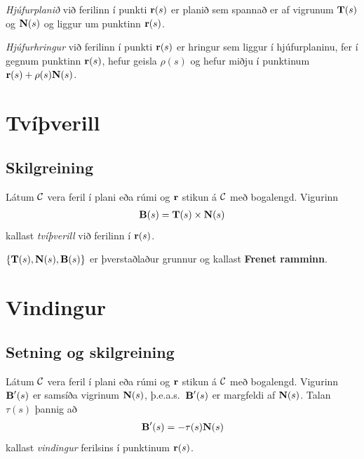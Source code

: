 \documentclass[a4paper,10pt,icelandic]{sphinxmanual}
\begin{document}
\textit{Hjúfurplanið} við ferilinn í punkti
\(\mbox{${\bf r}$}(s)\) er planið sem spannað er af vigrunum
\(\mbox{${\bf T}$}(s)\) og \(\mbox{${\bf N}$}(s)\) og liggur um
punktinn \(\mbox{${\bf r}$}(s)\).

\textit{Hjúfurhringur} við ferilinn í punkti
\(\mbox{${\bf r}$}(s)\) er hringur sem liggur í hjúfurplaninu, fer í
gegnum punktinn \(\mbox{${\bf r}$}(s)\), hefur geisla
\(\rho(s)\) og hefur miðju í punktinum
\(\mbox{${\bf r}$}(s)+\rho(s)\mbox{${\bf N}$}(s)\).


\section{Tvíþverill}
\label{Kafli1:tviverill}

\subsection{Skilgreining}
\label{Kafli1:id18}\label{Kafli1:index-18}
Látum \(\cal C\) vera feril í plani eða rúmi og
\(\mbox{${\bf r}$}\) stikun á \(\cal C\) með bogalengd. Vigurinn
\begin{gather}
\begin{split}\displaystyle \mbox{${\bf B}$}(s)=\mbox{${\bf T}$}(s)\times \mbox{${\bf N}$}(s)\end{split}\notag
\end{gather}
kallast \textit{tvíþverill} við ferilinn í
\(\mbox{${\bf r}$}(s)\).

\(\{\mbox{${\bf T}$}(s),\mbox{${\bf N}$}(s),\mbox{${\bf B}$}(s)\}\)
er þverstaðlaður grunnur og kallast \textbf{Frenet ramminn}.


\section{Vindingur}
\label{Kafli1:vindingur}

\subsection{Setning og skilgreining}
\label{Kafli1:index-19}\label{Kafli1:setning-og-skilgreining}
Látum \(\cal C\) vera feril í plani eða rúmi og
\(\mbox{${\bf r}$}\) stikun á \(\cal C\) með bogalengd. Vigurinn
\(\mbox{${\bf B}$}'(s)\) er samsíða vigrinum
\(\mbox{${\bf N}$}(s)\), þ.e.a.s. \(\mbox{${\bf B}$}'(s)\) er
margfeldi af \(\mbox{${\bf N}$}(s)\). Talan \(\tau(s)\) þannig
að
\begin{gather}
\begin{split}\displaystyle \mbox{${\bf B}$}'(s)=-\tau(s)\mbox{${\bf N}$}(s)\end{split}\notag
\end{gather}
kallast \textit{vindingur} ferilsins í punktinum \(\mbox{${\bf r}$}(s)\).
\end{document}
